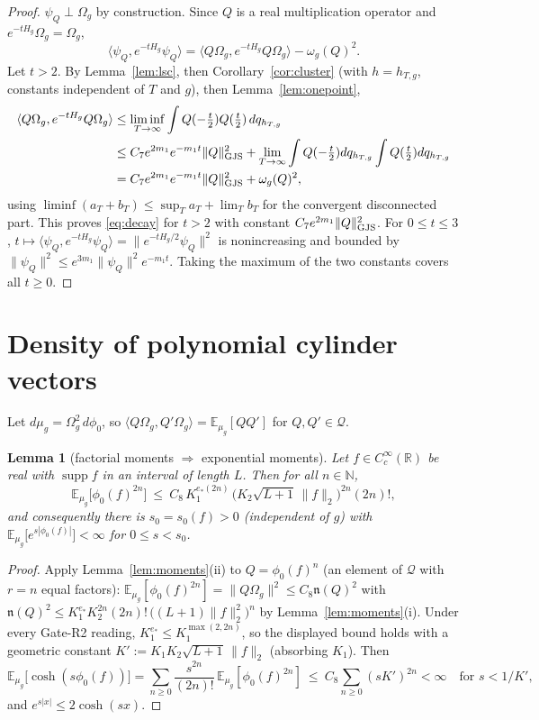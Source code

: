 \documentclass[11pt,a4paper]{article}
\theoremstyle{plain}
\newtheorem{lemma}[theorem]{Lemma}
\theoremstyle{definition}
\newcommand{\R}{\mathbb{R}}
\newcommand{\E}{\mathbb{E}}
\newcommand{\Om}{\Omega}
\newcommand{\Q}{\mathcal{Q}}
\newcommand{\ip}[2]{\langle #1,#2\rangle}
\DeclareMathOperator{\supp}{supp}
\begin{document}
\begin{proof}
$\psi_Q\perp\Om_g$ by construction. Since $Q$ is a real multiplication operator and
$e^{-tH_g}\Om_g=\Om_g$,
\[
  \ip{\psi_Q}{e^{-tH_g}\psi_Q}
  =\ip{Q\Om_g}{e^{-tH_g}Q\Om_g}-\omega_g(Q)^2 .
\]
Let $t>2$. By Lemma~\ref{lem:lsc}, then Corollary~\ref{cor:cluster} (with $h=h_{T,g}$, constants
independent of $T$ and $g$), then Lemma~\ref{lem:onepoint},
\begin{align*}
  \ip{Q\Om_g}{e^{-tH_g}Q\Om_g}
  &\le\liminf_{T\to\infty}\int Q(-\tfrac t2)Q(\tfrac t2)\,dq_{h_{T,g}}\\
  &\le C_7e^{2m_1}e^{-m_1t}\|Q\|_{\rm GJS}^2
    +\lim_{T\to\infty}\int Q(-\tfrac t2)dq_{h_{T,g}}\int Q(\tfrac t2)dq_{h_{T,g}}\\
  &=C_7e^{2m_1}e^{-m_1t}\|Q\|_{\rm GJS}^2+\omega_g(Q)^2 ,
\end{align*}
using $\liminf(a_T+b_T)\le\sup_Ta_T+\lim_Tb_T$ for the convergent disconnected part. This proves
\eqref{eq:decay} for $t>2$ with constant $C_7e^{2m_1}\|Q\|^2_{\rm GJS}$. For $0\le t\le3$,
$t\mapsto\ip{\psi_Q}{e^{-tH_g}\psi_Q}=\|e^{-tH_g/2}\psi_Q\|^2$ is nonincreasing and bounded by
$\|\psi_Q\|^2\le e^{3m_1}\|\psi_Q\|^2e^{-m_1t}$. Taking the maximum of the two constants covers
all $t\ge0$.
\end{proof}

\section{Density of polynomial cylinder vectors}\label{sec:dense}

Let $d\mu_g=\Om_g^2\,d\phi_0$, so $\ip{Q\Om_g}{Q'\Om_g}=\E_{\mu_g}[QQ']$ for $Q,Q'\in\Q$.

\begin{lemma}[factorial moments $\Rightarrow$ exponential moments]\label{lem:expmom}
Let $f\in C_c^\infty(\R)$ be real with $\supp f$ in an interval of length $L$. Then for all
$n\in\mathbb N$,
\[
  \E_{\mu_g}\bigl[\phi_0(f)^{2n}\bigr]\ \le\ C_8\,K_1^{e_*(2n)}\,\bigl(K_2\sqrt{L+1}\,\|f\|_2\bigr)^{2n}(2n)! ,
\]
and consequently there is $s_0=s_0(f)>0$ (independent of $g$) with
$\E_{\mu_g}\bigl[e^{s|\phi_0(f)|}\bigr]<\infty$ for $0\le s<s_0$.
\end{lemma}

\begin{proof}
Apply Lemma~\ref{lem:moments}(ii) to $Q=\phi_0(f)^n$ (an element of $\Q$ with $r=n$ equal factors):
$\E_{\mu_g}[\phi_0(f)^{2n}]=\|Q\Om_g\|^2\le C_8\mathfrak n(Q)^2$ with
$\mathfrak n(Q)^2\le K_1^{e_*}K_2^{2n}(2n)!\,\bigl((L+1)\|f\|_2^2\bigr)^{n}$ by
Lemma~\ref{lem:moments}(i). Under every Gate-R2 reading, $K_1^{e_*}\le K_1^{\max(2,2n)}$, so the
displayed bound holds with a geometric constant $K':=K_1K_2\sqrt{L+1}\,\|f\|_2$ (absorbing
$K_1$). Then
\[
  \E_{\mu_g}\bigl[\cosh(s\phi_0(f))\bigr]=\sum_{n\ge0}\frac{s^{2n}}{(2n)!}\,
  \E_{\mu_g}[\phi_0(f)^{2n}]\ \le\ C_8\sum_{n\ge0}(sK')^{2n}<\infty
  \quad\text{for } s<1/K' ,
\]
and $e^{s|x|}\le 2\cosh(sx)$.
\end{proof}
\end{document}
